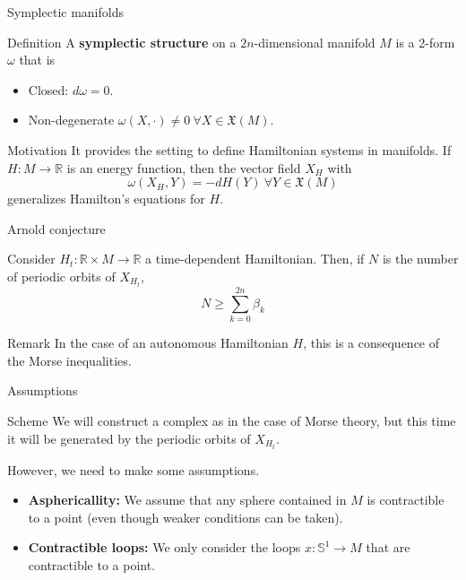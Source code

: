 \documentclass{beamer}
\newcommand{\con}[1]{\mathbb{#1}}
\newcommand{\R}{\con{R}}
\begin{document}
\begin{frame}{Symplectic manifolds}
	\begin{block}{Definition}
		A {\bf symplectic structure} on a $2n$-dimensional manifold $M$ is a 2-form $\omega$ that is
		\begin{itemize}
			\item Closed: $d\omega = 0$.
			\item Non-degenerate $\omega(X,\cdot) \neq 0 \ \forall X \in \mathfrak{X}(M)$.
		\end{itemize}
	\end{block}

	\begin{block}{Motivation}
		It provides the setting to define Hamiltonian systems in manifolds. If $H : M \rightarrow \R$ is an energy function, then the vector field $X_H$ with
		\[\omega(X_H,Y) = -dH(Y) \ \forall Y \in \mathfrak{X}(M)\]
		generalizes Hamilton's equations for $H$.
	\end{block}
\end{frame}

\begin{frame}{Arnold conjecture}
	\begin{theorem}
		Consider $H_t : \R \times M \rightarrow \R$ a time-dependent Hamiltonian. Then, if $N$ is the number of periodic orbits of $X_{H_t}$,
		\[N \geq \sum_{k=0}^{2n} \beta_k\]
	\end{theorem}

	\begin{block}{Remark}
		In the case of an autonomous Hamiltonian $H$, this is a consequence of the Morse inequalities.
	\end{block}
\end{frame}

\begin{frame}{Assumptions}
	\begin{block}{Scheme}
		We will construct a complex as in the case of Morse theory, but this time it will be generated by the periodic orbits of $X_{H_t}$.

		However, we need to make some assumptions.
	\end{block}
	\begin{itemize}
		\item {\bf Asphericallity:} We assume that any sphere contained in $M$ is contractible to a point (even though weaker conditions can be taken).
		\item {\bf Contractible loops:} We only consider the loops $x : \con{S}^1 \rightarrow M$ that are contractible to a point.
	\end{itemize}
\end{frame}
\end{document}
